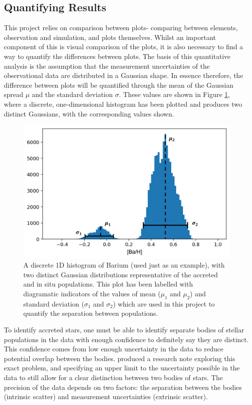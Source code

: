 \documentclass[fleqn,usenatbib]{mnras}
\begin{document}
 
 \subsection{Quantifying Results}
\label{subsec:quant}
This project relies on comparison between plots- comparing between elements, observation and simulation, and plots themselves. Whilst an important component of this is visual comparison of the plots, it is also necessary to find a way to quantify the differences between plots. The basis of this quantitative analysis is the assumption that the measurement uncertainties of the observational data are distributed in a Gaussian shape. In essence therefore, the difference between plots will be quantified through the mean of the Gaussian spread $\mu$ and the standard deviation $\sigma$. These values are shown in Figure \ref{fig:hist_labels}, where a discrete, one-dimensional histogram has been plotted and produces two distinct Gaussians, with the corresponding values shown. 
\begin{figure}
	\includegraphics[width=\columnwidth]{figures/hist_labelled.png}
    \caption{A discrete 1D histogram of Barium (used just as an example), with two distinct Gaussian distributions representative of the accreted and in situ populations. This plot has been labelled with diagramatic indicators of the values of mean ($\mu_1$ and $\mu_2$) and standard deviation ($\sigma_1$ and $\sigma_2$) which are used in this project to quantify the separation between populations.}
    \label{fig:hist_labels}
\end{figure}

 
To identify accreted stars, one must be able to identify separate bodies of stellar populations in the data with enough confidence to definitely say they are distinct. This confidence comes from low enough uncertainty in the data to reduce potential overlap between the bodies. \citet{Lindegren2013} produced a research note exploring this exact problem, and specifying an upper limit to the uncertainty possible in the data to still allow for a clear distinction between two bodies of stars. The precision of the data depends on two factors: the separation between the bodies (intrinsic scatter) and measurement uncertainties (extrinsic scatter). 
\end{document}

